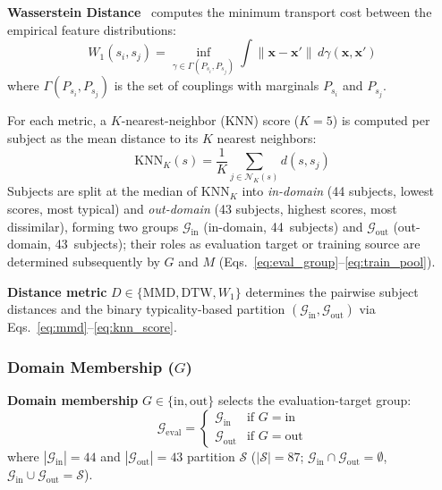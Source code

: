 \documentclass[lettersize,journal]{IEEEtran}
\begin{document}
\textbf{Wasserstein Distance}~\cite{villani2009} computes the minimum transport cost between the empirical feature distributions:
\begin{equation}
\label{eq:wasserstein}
W_1(s_i, s_j) = \inf_{\gamma \in \Gamma(P_{s_i}, P_{s_j})} \int \|\mathbf{x} - \mathbf{x}'\|\, d\gamma(\mathbf{x}, \mathbf{x}')
\end{equation}
where $\Gamma(P_{s_i}, P_{s_j})$ is the set of couplings with marginals $P_{s_i}$ and $P_{s_j}$.

For each metric, a $K$-nearest-neighbor (KNN) score ($K = 5$) is computed per subject as the mean distance to its $K$ nearest neighbors:
\begin{equation}
\label{eq:knn_score}
\mathrm{KNN}_K(s) = \frac{1}{K} \sum_{j \in \mathcal{N}_K(s)} d(s, s_j)
\end{equation}
Subjects are split at the median of $\mathrm{KNN}_K$ into \emph{in-domain} (44 subjects, lowest scores, most typical) and \emph{out-domain} (43 subjects, highest scores, most dissimilar), forming two groups $\mathcal{G}_{\mathrm{in}}$ (in-domain, 44~subjects) and $\mathcal{G}_{\mathrm{out}}$ (out-domain, 43~subjects); their roles as evaluation target or training source are determined subsequently by $G$ and $M$ (Eqs.~\eqref{eq:eval_group}--\eqref{eq:train_pool}).

\textbf{Distance metric} $D \in \{\mathrm{MMD}, \mathrm{DTW}, W_1\}$ determines the pairwise subject distances and the binary typicality-based partition $(\mathcal{G}_{\mathrm{in}}, \mathcal{G}_{\mathrm{out}})$ via Eqs.~\eqref{eq:mmd}--\eqref{eq:knn_score}.

\subsubsection{Domain Membership ($G$)}
\textbf{Domain membership} $G \in \{\mathrm{in}, \mathrm{out}\}$ selects the evaluation-target group:
\begin{equation}
\label{eq:eval_group}
\mathcal{G}_{\mathrm{eval}} =
\begin{cases}
\mathcal{G}_{\mathrm{in}}  & \text{if } G = \mathrm{in} \\
\mathcal{G}_{\mathrm{out}} & \text{if } G = \mathrm{out}
\end{cases}
\end{equation}
where $|\mathcal{G}_{\mathrm{in}}| = 44$ and $|\mathcal{G}_{\mathrm{out}}| = 43$ partition $\mathcal{S}$ ($|\mathcal{S}| = 87$; $\mathcal{G}_{\mathrm{in}} \cap \mathcal{G}_{\mathrm{out}} = \emptyset$, $\mathcal{G}_{\mathrm{in}} \cup \mathcal{G}_{\mathrm{out}} = \mathcal{S}$).
\end{document}
